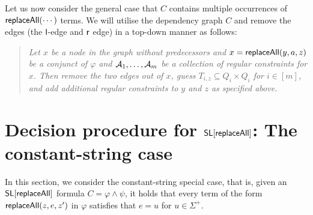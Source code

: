 Let us now consider the general case that $C$ contains multiple occurrences of $\mathsf{replaceAll}(\cdots)$ terms.  We will utilise the dependency graph $C$ and remove the edges (the $\mathsf{l}$-edge and $\mathsf{r}$ edge) in a top-down manner as follows: 
\begin{quote}
\it Let $x$ be a node in the graph without predecessors and $x = \mathsf{replaceAll}(y, a, z)$ be a conjunct of $\varphi$ and $\mathcal{A}_1, \dots, \mathcal{A}_m$ be a collection of regular constraints for $x$. Then remove the two edges out of $x$, guess $T_{i, z} \subseteq Q_i \times Q_i$ for $i \in [m]$, and add additional regular constraints to $y$ and $z$ as specified above. 
\end{quote}




\begin{example}
\end{example}



\section{Decision procedure for $\mathsf{SL}[\mathsf{replaceAll}]$: The constant-string case}

In this section, we consider the constant-string special case, that is, given an $\mathsf{SL}[\mathsf{replaceAll}]$ formula $C = \varphi \wedge \psi$, it holds that every term of the form $\mathsf{replaceAll}(z, e, z')$ in $\varphi$ satisfies that $e=u$ for $u \in \Sigma^+$.

